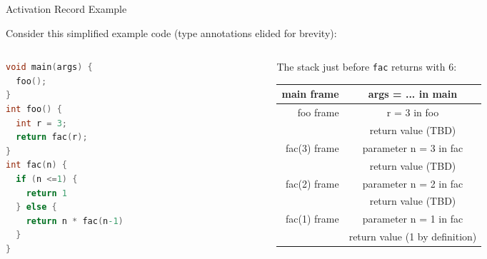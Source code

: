 \documentclass{beamer}
\begin{document}
\begin{frame}[fragile]{Activation Record Example}

Consider this simplified example code (type annotations elided for brevity):
\scriptsize
\begin{columns}
\begin{column}{4cm}
\begin{lstlisting}[language=C]
void main(args) {
  foo();
}
int foo() {
  int r = 3;
  return fac(r);
}
int fac(n) {
  if (n <=1) {
    return 1
  } else {
    return n * fac(n-1)
  }
}
\end{lstlisting}
\end{column}
\small
\begin{column}{6.5cm}
The stack just before {\tt fac} returns with 6:
\begin{tabular}{r|c|}\hline
main frame & args = ... in main \\ \hline
foo frame & r = 3 in foo \\
 & return value (TBD) \\ \hline
fac(3) frame & parameter n = 3 in fac \\
 & return value (TBD) \\ \hline
fac(2) frame & parameter n = 2 in fac \\
 & return value (TBD) \\ \hline
fac(1) frame & parameter n = 1 in fac \\
 & return value (1 by definition) \\ \hline
\end{tabular}

\end{column}
\end{columns}

\normalsize

\end{frame}
\end{document}
